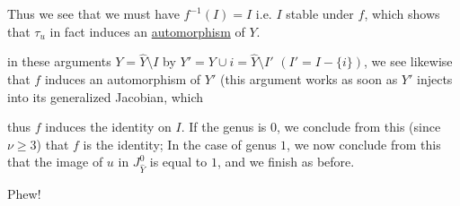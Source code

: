 

 Thus we see that we must have $f^{-1}(I)=I$ i.e. $I$ stable under $f$, which shows that $\tau_u$ in fact induces an \uline{automorphism} of $Y$.


in these arguments $Y=\widehat Y\setminus I$ by $Y'=Y\cup i=\widehat Y\setminus I'$ $(I'=I-\{i\})$, we see likewise that $f$ induces an automorphism of $Y'$ (this argument works as soon as $Y'$ injects into its generalized Jacobian, which  

 thus $f$ induces the identity on $I$. If the genus is $0$, we conclude from this (since $\nu\geq3$) that $f$ is the identity;  In the case of genus $1$, we now conclude from this that the image of $u$ in $J_{\widehat Y}^0$ is equal to $1$, and we finish as before.

Phew!
